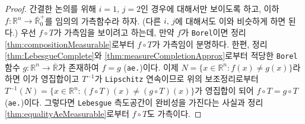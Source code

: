 \begin{proof}
    간결한 논의를 위해 $i=1,\,j=2$인 경우에 대해서만 보이도록 하고, 이하 $f:\mathbb{R}^n\to\overline{\mathbb{R}}^+_0$를 임의의 가측함수라 하자. (다른 $i,\,j$에 대해서도 이와 비슷하게 하면 된다.) 우선 $f\circ T$가 가측임을 보이려고 하는데, 만약 $f$가 \texttt{Borel}이면 정리 \ref{thm:compositionMeasurable}로부터 $f\circ T$가 가측임이 분명하다. 한편, 정리 \ref{thm:LebesgueComplete}와 \ref{thm:measureCompletionApprox}로부터 적당한 \texttt{Borel} 함수 $g:\mathbb{R}^n\to\overline{\mathbb{R}}$가 존재하여 $f=g$ (\texttt{ae.})이다. 이제 $N=\{x\in\mathbb{R}^n:f(x)\ne g(x)\}$라 하면 이가 영집합이고 $T^{-1}$가 \texttt{Lipschitz} 연속이므로 위의 보조정리로부터 $T^{-1}(N)=\{x\in\mathbb{R}^n:(f\circ T)(x)\ne(g\circ T)(x)\}$가 영집합이 되어 $f\circ T=g\circ T$ (\texttt{ae.})이다. 그렇다면 \texttt{Lebesgue} 측도공간이 완비성을 가진다는 사실과 정리 \ref{thm:equalityAeMeasurable}로부터 $f\circ T$도 가측이다.


\end{proof}
